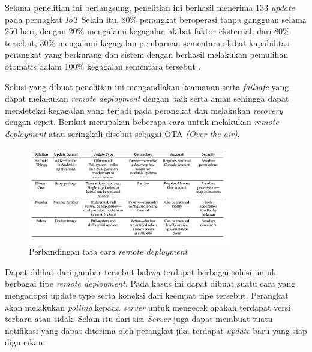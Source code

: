Selama penelitian ini berlangsung, penelitian ini berhasil menerima 133 \textit{update} pada pernagkat \textit{IoT} Selain itu, 80\% perangkat beroperasi tanpa gangguan selama 250 hari, dengan 20\% mengalami kegagalan akibat faktor eksternal; dari 80\% tersebut, 30\% mengalami kegagalan pembaruan sementara akibat kapabilitas perangkat yang berkurang dan sistem dengan berhasil melakukan pemulihan otomatis dalam 100\% kegagalan sementara tersebut \parencite{RemoteDeployment}.

Solusi yang dibuat penelitian ini mengandlakan keamanan serta \textit{failsafe} yang dapat melakukan \textit{remote deployment} dengan baik serta aman sehingga dapat mendeteksi kegagalan yang terjadi pada perangkat dan melakukan \textit{recovery} dengan cepat. Berikut merupakan beberapa cara untuk melakukan \textit{remote deployment} atau seringkali disebut sebagai OTA \textit{(Over the air)}.


\begin{figure}[h]
  \centering
  \includegraphics[width=0.8\textwidth]{resources/chapter-2/perbandingan-remote-deployment.jpg}
  \caption{Perbandingan tata cara \textit{remote deployment} \parencite{RemoteDeployment}}
  \label{fig:comparison-remote-deployments}
\end{figure}

Dapat dilihat dari gambar tersebut bahwa terdapat berbagai solusi untuk berbagai tipe \textit{remote deployment}. Pada kasus ini dapat dibuat suatu cara yang mengadopsi update type serta koneksi dari keempat tipe tersebut. Perangkat akan melakukan \textit{polling} kepada \textit{server} untuk mengecek apakah terdapat versi terbaru atau tidak. Selain itu dari sisi \textit{Server} juga dapat membuat suatu notifikasi yang dapat diterima oleh perangkat jika terdapat \textit{update} baru yang siap digunakan.


